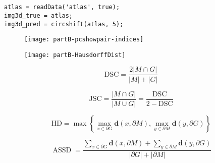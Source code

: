 \chapter{}

\begin{latin}
\begin{lstlisting}[frame=none]
atlas = readData('atlas', true);
img3d_true = atlas;
img3d_pred = circshift(atlas, 5);
\end{lstlisting}
\end{latin}

\begin{figure}[t!]
	\centering
	\texttt{[image: partB-pcshowpair-indices]}
	\caption{}
	\label{fig:partB:pcshowpair-indices}
\end{figure}

\begin{figure}[t!]
	\centering
	\texttt{[image: partB-HausdorffDist]}
	\caption{}
	\label{fig:partB:HausdorffDist}
\end{figure}



\begin{equation}\mathrm{DSC}=\frac{2|M \cap G|}{|M|+|G|}\end{equation}

\begin{equation}\mathrm{JSC}=\frac{|M \cap G|}{|M \cup G|}=\frac{\mathrm{DSC}}{2-\mathrm{DSC}}\end{equation}

\begin{equation}\mathrm{HD}=\max \left\{\max _{x \in \partial G} \mathbf{d}(x, \partial M), \max _{y \in \partial M} \mathbf{d}(y, \partial G)\right\}\end{equation}

\begin{equation}\operatorname{ASSD}=\frac{\sum_{x \in \partial G} \mathbf{d}(x, \partial M)+\sum_{y \in \partial M} \mathbf{d}(y, \partial G)}{|\partial G|+|\partial M|}\end{equation}


\begin{table}[b!]
	\centering
	\begin{LTR}
			\end{LTR}
\end{table}





